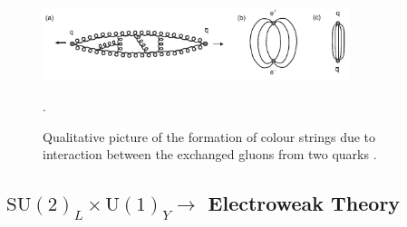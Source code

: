 \begin{figure}[h]
    \centering
    \includegraphics[width=0.8\textwidth]{Figures/standard_model/confinement.pdf}
    \begin{subfigure}{0pt}\label{fig:confinement_a}\end{subfigure}
    \begin{subfigure}{0pt}\label{fig:confinement_b}\end{subfigure}
    \begin{subfigure}{0pt}\label{fig:confinement_c}\end{subfigure}
    \caption{Qualitative picture of the formation of colour strings due to interaction between the exchanged gluons from two quarks \cite{ModernParticlePhysics}.}.
    \label{fig:confinement}
\end{figure}

\subsection{\texorpdfstring{$\text{SU}(2)_L \times \text{U}(1)_Y \rightarrow$}{SU(2)xSU(1)-} Electroweak Theory}
\label{sec:electroweak}

